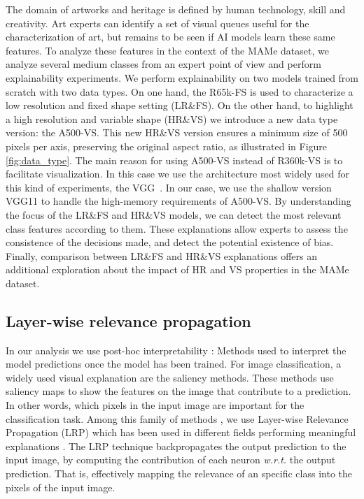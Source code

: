 \documentclass{article}
\newcommand{\wrt}{{\it w.r.t. }}    \newcommand{\eg}{\emph{e.g.}, }     \newcommand{\ie}{\emph{i.e.}, }     \newcommand{\etal}{\emph{et al.}}   \newcommand\etc{\emph{etc.}}
\begin{document}
The domain of artworks and heritage is defined by human technology, skill and creativity. Art experts can identify a set of visual queues useful for the characterization of art, but remains to be seen if AI models learn these same features. To analyze these features in the context of the MAMe dataset, we analyze several medium classes from an expert point of view and perform explainability experiments. We perform explainability on two models trained from scratch with two data types. On one hand, the R65k-FS is used to characterize a low resolution and fixed shape setting (LR\&FS). On the other hand, to highlight a high resolution and variable shape (HR\&VS) we introduce a new data type version: the A500-VS. This new HR\&VS version ensures a minimum size of 500 pixels per axis, preserving the original aspect ratio, as illustrated in Figure \ref{fig:data_type}. The main reason for using A500-VS instead of R360k-VS is to facilitate visualization. In this case we use the architecture most widely used for this kind of experiments, the VGG~\citep{simonyan2014very}. In our case, we use the shallow version VGG11 to handle the high-memory requirements of A500-VS. By understanding the focus of the LR\&FS and HR\&VS models, we can detect the most relevant class features according to them. These explanations allow experts to assess the consistence of the decisions made, and detect the potential existence of bias. Finally, comparison between LR\&FS and HR\&VS explanations offers an additional exploration about the impact of HR and VS properties in the MAMe dataset.

\subsection{Layer-wise relevance propagation}

In our analysis we use post-hoc interpretability \citep{mythos}: Methods used to interpret the model predictions once the model has been trained. For image classification, a widely used visual explanation are the saliency methods. These methods use saliency maps to show the features on the image that contribute to a prediction. In other words, which pixels in the input image are important for the classification task. Among this family of methods \citep{Selvaraju_2019, simonyan2013deep, springenberg2014striving, sundararajan2017axiomatic, zeiler2013visualizing}, we use Layer-wise Relevance Propagation (LRP) \citep{lrp} which has been used in different fields performing meaningful explanations \citep{10.1007/978-3-319-45886-1_28, DBLP:journals/corr/SturmBSM16, thomas2018interpretable, alex2018computational}. The LRP technique backpropagates the output prediction to the input image, by computing the contribution of each neuron \wrt the output prediction. That is, effectively mapping the relevance of an specific class into the pixels of the input image. 
\end{document}
